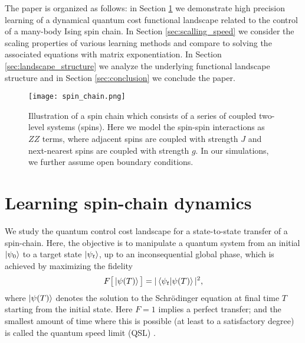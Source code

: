\documentclass[aps, twocolumn,superscriptaddress]{revtex4-1}
\begin{document}
The paper is organized as follows: in Section \ref{sec:learningspinchaindyn} we demonstrate high precision learning of a dynamical quantum cost functional landscape related to the control of a many-body Ising spin chain. In Section \ref{sec:scalling_speed} we consider the scaling properties of various learning methods and compare to solving the associated equations with matrix exponentiation. In Section \ref{sec:landscape_structure} we analyze the underlying functional landscape structure and in Section \ref{sec:conclusion} we conclude the paper.  

\begin{figure*}
    \centering
    \texttt{[image: spin\_chain.png]}
    \caption{Illustration of a spin chain which consists of a series of coupled two-level systems (spins). Here we model the spin-spin interactions as $ZZ$ terms, where adjacent spins are coupled with strength $J$ and next-nearest spins are coupled with strength $g$. In our simulations, we further assume open boundary conditions.} 
    \label{fig:spin_chain}
\end{figure*}



\section{Learning spin-chain dynamics} \label{sec:learningspinchaindyn}

We study the quantum control cost landscape for a state-to-state transfer of a spin-chain. Here, the objective is to manipulate a quantum system from an initial $\ket{\psi_0}$ to a target state $\ket{\psi_t}$, up to an inconsequential global phase, which is achieved by maximizing the fidelity 
\begin{align}
    F \big[\ket{\psi(T)} \big] = |\braket{\psi_t|\psi(T)}|^2,
    \label{eq:fidelity}
\end{align}
where $\ket{\psi(T)}$ denotes the solution to the Schrödinger equation at final time $T$ starting from the initial state. Here $F = 1$ implies a perfect transfer; and the smallest amount of time where this is possible (at least to a satisfactory degree) is called the quantum speed limit (QSL) \cite{caneva2009optimal}. 
\end{document}
